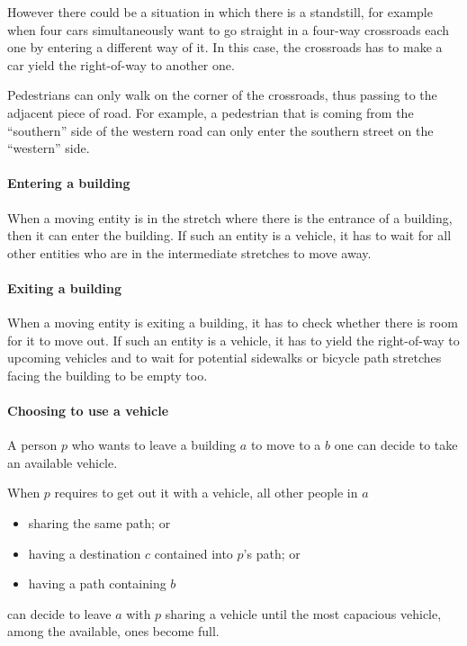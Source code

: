 However there could be a situation in which there is a standstill,
for example when four cars simultaneously want to go straight in
a four-way crossroads each one by entering a different way of it.
In this case, the crossroads has to make a car yield the right-of-way 
to another one.

Pedestrians can only walk on the corner of the crossroads, thus passing to the
adjacent piece of road. For example, a pedestrian that is coming from 
the ``southern'' side of the western road can only enter the southern street 
on the ``western'' side.

\paragraph{Entering a building} When a moving entity is in the stretch where
there is the entrance of a building, then it can enter the building.
If such an entity is a vehicle, it has to wait for all other entities who
are in the intermediate stretches to move away.

\paragraph{Exiting a building} When a moving entity is exiting a building, it
has to check whether there is room for it to move out.
If such an entity is a vehicle, it has to yield the right-of-way to 
upcoming vehicles and to wait for potential sidewalks or 
bicycle path stretches facing the building to be empty too.

\paragraph{Choosing to use a vehicle} A person $p$ who wants to leave a
building $a$ to move to a $b$ one can decide to take an available vehicle.

When $p$ requires to get out it with a vehicle,
all other people in $a$
\begin{itemize}
  \item sharing the same path; or
  \item having a destination $c$ contained into $p$'s path; or
  \item having a path containing $b$
\end{itemize}
can decide to leave $a$ with $p$ sharing a vehicle
until the most capacious vehicle, among the available, ones become full.

